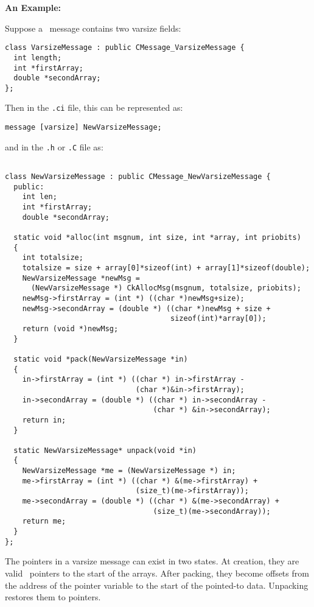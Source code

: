 {\bf An Example:}

Suppose a \charmpp\ message contains two varsize fields:

\begin{verbatim} 
class VarsizeMessage : public CMessage_VarsizeMessage { 
  int length; 
  int *firstArray; 
  double *secondArray; 
}; 
\end{verbatim}

Then in the {\tt .ci} file, this can be represented as: 

\begin{verbatim}
message [varsize] NewVarsizeMessage;
\end{verbatim}

and in the {\tt .h} or {\tt .C} file as:

\begin{verbatim} 

class NewVarsizeMessage : public CMessage_NewVarsizeMessage { 
  public: 
    int len; 
    int *firstArray; 
    double *secondArray; 

  static void *alloc(int msgnum, int size, int *array, int priobits) 
  { 
    int totalsize; 
    totalsize = size + array[0]*sizeof(int) + array[1]*sizeof(double); 
    NewVarsizeMessage *newMsg = 
      (NewVarsizeMessage *) CkAllocMsg(msgnum, totalsize, priobits); 
    newMsg->firstArray = (int *) ((char *)newMsg+size); 
    newMsg->secondArray = (double *) ((char *)newMsg + size + 
                                      sizeof(int)*array[0]); 
    return (void *)newMsg; 
  } 

  static void *pack(NewVarsizeMessage *in) 
  { 
    in->firstArray = (int *) ((char *) in->firstArray - 
                              (char *)&in->firstArray); 
    in->secondArray = (double *) ((char *) in->secondArray - 
                                  (char *) &in->secondArray); 
    return in; 
  } 

  static NewVarsizeMessage* unpack(void *in) 
  { 
    NewVarsizeMessage *me = (NewVarsizeMessage *) in; 
    me->firstArray = (int *) ((char *) &(me->firstArray) + 
                              (size_t)(me->firstArray)); 
    me->secondArray = (double *) ((char *) &(me->secondArray) + 
                                  (size_t)(me->secondArray)); 
    return me;
  } 
}; 
\end{verbatim}

The pointers in a varsize message can exist in two states.  
At creation, they are valid \CC\ pointers to the start of the arrays.  
After packing, they become offsets from the address of the pointer variable to 
the start of the pointed-to data.  Unpacking restores them to pointers. 


